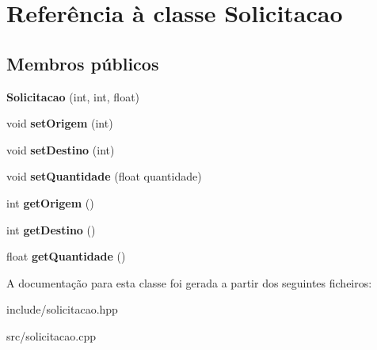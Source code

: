 \hypertarget{classSolicitacao}{}\section{Referência à classe Solicitacao}
\label{classSolicitacao}
\subsection*{Membros públicos}
\begin{DoxyCompactItemize}
\item 
\mbox{\label{classSolicitacao_a7488a91778013e8666db5f3dde061e2c}} 
{\bfseries Solicitacao} (int, int, float)
\item 
\mbox{\label{classSolicitacao_a585f55cfa44c1e16d535935eead17f44}} 
void {\bfseries set\+Origem} (int)
\item 
\mbox{\label{classSolicitacao_ac772a2517a1d395f1a541424d29716cd}} 
void {\bfseries set\+Destino} (int)
\item 
\mbox{\label{classSolicitacao_acf1db9c6843df635aca0bbacae8cf7c7}} 
void {\bfseries set\+Quantidade} (float quantidade)
\item 
\mbox{\label{classSolicitacao_a53a5b37dd6aca895d84ef9991fc7775b}} 
int {\bfseries get\+Origem} ()
\item 
\mbox{\label{classSolicitacao_a8448e5d5b0ca18b7e8ff022415ec6836}} 
int {\bfseries get\+Destino} ()
\item 
\mbox{\label{classSolicitacao_a7e936983b3b1c6d4010649edcbac4819}} 
float {\bfseries get\+Quantidade} ()
\end{DoxyCompactItemize}


A documentação para esta classe foi gerada a partir dos seguintes ficheiros\+:\begin{DoxyCompactItemize}
\item 
include/solicitacao.\+hpp\item 
src/solicitacao.\+cpp\end{DoxyCompactItemize}
